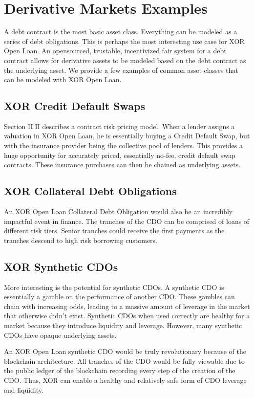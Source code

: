 \documentclass[twoside]{article}
\begin{document}
\section{Derivative Markets Examples}
A debt contract is the most basic asset class. Everything can be modeled as a series of debt obligations. This is perhaps the most interesting use case for XOR Open Loan. An opensourced, trustable, incentivized fair system for a debt contract allows for derivative assets to be modeled based on the debt contract as the underlying asset. We provide a few examples of common asset classes that can be modeled with XOR Open Loan. 
\subsection{XOR Credit Default Swaps}
Section II.II describes a contract risk pricing model. When a lender assigns a valuation in XOR Open Loan, he is essentially buying a Credit Default Swap, but with the insurance provider being the collective pool of lenders. This provides a huge opportunity for accurately priced, essentially no-fee, credit default swap contracts. These insurance purchases can then be chained as underlying assets. 
\subsection{XOR Collateral Debt Obligations}
An XOR Open Loan Collateral Debt Obligation would also be an incredibly impactful event in finance. The tranches of the CDO can be comprised of loans of different risk tiers. Senior tranches could receive the first payments as the tranches descend to high risk borrowing customers. 
\subsection{XOR Synthetic CDOs}
More interesting is the potential for synthetic CDOs. A synthetic CDO is essentially a gamble on the performance of another CDO. These gambles can chain with increasing odds, leading to a massive amount of leverage in the market that otherwise didn't exist. Synthetic CDOs when used correctly are healthy for a market because they introduce liquidity and leverage. However, many synthetic CDOs have opaque underlying assets. 

An XOR Open Loan synthetic CDO would be truly revolutionary because of the blockchain architecture. All tranches of the CDO would be fully viewable due to the public ledger of the blockchain recording every step of the creation of the CDO. Thus, XOR can enable a healthy and relatively safe form of CDO leverage and liquidity. 
\end{document}
